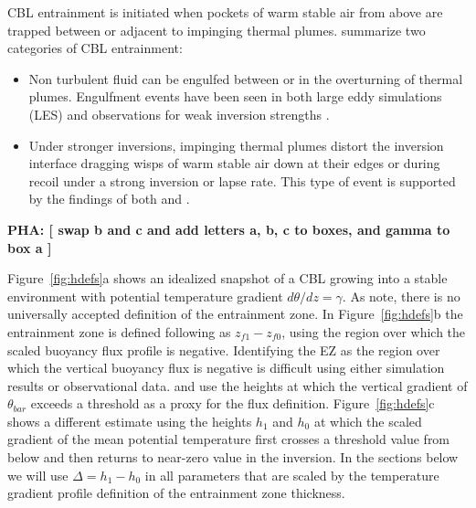 \documentclass[referee]{svjour3}
\newcommand{\remarkpha}[1]{{ \bf PHA:  [ \footnotesize #1 ]}}
\begin{document}
CBL entrainment is initiated when pockets of warm stable air from above are trapped between or adjacent to impinging thermal plumes.  \citep{Traum11} summarize two categories of CBL entrainment:\\

\begin{itemize}

\item{Non turbulent fluid can be engulfed between or in the overturning of thermal plumes. Engulfment events have been seen in both   large eddy simulations (LES) and observations for weak inversion strengths \citep{Sullivan98,Traum11}.}  

\item{
Under stronger inversions, impinging thermal plumes distort the inversion interface dragging wisps of warm stable air down at their edges or during recoil under a strong inversion or lapse rate. This type of event is supported by the findings  of both \cite{Sullivan98} and \cite{Traum11}.}

\end{itemize}

\remarkpha{swap b and c and add letters a, b, c to boxes, and gamma to box a}


Figure~\ref{fig:hdefs}a shows an idealized  snapshot of a CBL growing into a stable environment with potential temperature gradient $d\theta/dz = \gamma$.  As \citet{Brooks12} note, there is no universally accepted definition of the entrainment zone. In Figure~\ref{fig:hdefs}b the entrainment zone is defined following as $z_{f1} - z_{f0}$, using the region over which the scaled buoyancy flux profile is negative.  Identifying the EZ as the region over which the vertical buoyancy flux is negative is difficult using either simulation results or observational data.  \citet{Cohn00} and \citet{Fedorovich04} use the heights at which the vertical gradient of $\theta_{bar}$ exceeds a threshold as a proxy for the flux definition.  Figure~\ref{fig:hdefs}c shows a different estimate using the heights $h_1$ and $h_0$ at which the scaled gradient of the mean potential temperature first crosses a threshold value from below and then returns to near-zero value in the inversion.  In the sections below we will use $\Delta = h_1 - h_0$ in all parameters that are scaled by the temperature gradient profile definition of the entrainment zone thickness.
\end{document}
